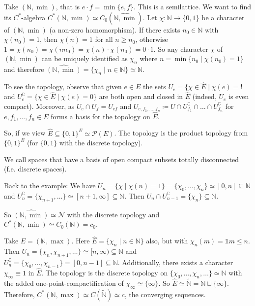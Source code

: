 \documentclass[a4paper]{article}
\begin{document}
\begin{example}
	Take $(\mathds{N}, \min)$, that is $e \cdot f = \min\{e, f\}$.
	This is a semilattice.
	We want to find its $C^*$-algebra $C^*(\mathds{N}, \min) \simeq C_0(\widehat{\mathds{N}, \min})$.
	Let $\chi: \mathds{N} \to \{0,1\}$ 
	be a character of $(\mathds{N}, \min)$ (a non-zero homomorphism).
	If there exists $n_0 \in \mathds{N}$ with $\chi(n_0) = 1$, then $\chi(n) = 1$ for all $n \geq n_0$, otherwise $1 = \chi(n_0) = \chi(n n_0) = \chi(n) \cdot \chi(n_0) = 0 \cdot 1$.
	So any character $\chi$ of $(\mathds{N}, \min)$ can be uniquely identified as $\chi_n$ where $n = \min\{n_0 \mid \chi(n_0) = 1\}$ and therefore $\widehat{(\mathds{N}, \min)} = \{\chi_n \mid n \in \mathds{N} \} \simeq \mathds{N}$. 

	To see the topology, observe that given $e \in E$ the sets $U_e = \{\chi \in \hat{E} \mid \chi(e) = !$ and $U_e^\complement = \{ \chi \in \hat{E} \mid \chi(e) = 0 \}$ are both open and closed in $\hat{E}$ (indeed, $U_e$ is even compact).
	Moreover, as $U_e \cap U_f = U_{ef}$ and $U_{e, f_1, \dots, f_n} \coloneq U \cap U_{f_1 }^\complement \cap \dots \cap U_{f_n}^\complement$ for $e, f_1, \dots, f_n \in E$ forms a basis for the topology on $\hat{E}$. 

	So, if we view $\hat{E} \subseteq \{0,1\}^E \simeq \mathcal{P}(E)$.
	The topology is the product topology from $\{0,1\}^E$ (for $\{0,1\}$ with the discrete topology).

	We call spaces that have a basis of open compact subsets totally disconnected (f.e. discrete spaces).

	Back to the example: We have $U_n = \{ \chi \mid \chi(n) = 1 \} = \{\chi_0, \dots, \chi_n\} \simeq [0,n] \subseteq \mathds{N}$ and $U_n^\complement = \{ \chi_{n+1}, \dots \} \simeq [n+1, \infty] \subseteq \mathds{N}$.
	Then $U_n \cap U_{n-1}^\complement = \{\chi_n\} \subseteq \mathds{N}$.

	So $\widehat{(\mathds{N}, \min)} \simeq \mathscr{N}$ with the discrete topology and $C^*(\mathds{N}, \min) \simeq C_0(\mathds{N}) = c_0$.
\end{example}

\begin{example}
	Take $E = (\mathds{N}, \max)$.
	Here $\hat{E} = \{ \chi_n \mid n \in \mathds{N}\}$ also, but with $\chi_n(m) = \mathds{1}{m \leq n}$.
	Then $U_n = \{\chi_n, \chi_{n+1}, \dots \}\simeq [n, \infty) \subseteq \mathds{N}$ and $U_n^\complement = \{\chi_0, \dots, \chi_{n-1}\} = [0, n-1] \subseteq \mathds{N}$.
	Additionally, there exists a character $\chi_\infty \equiv 1$ in $\hat{E}$.
	The topology is the discrete topology on $\{ \chi_0, \dots, \chi_n, \dots \} \simeq \mathds{N}$ with the added one-point-compactification of $\chi_\infty \simeq \{\infty\}$.
	So $\hat{E} \simeq \tilde{\mathds{N}} = \mathds{N} \sqcup \{ \infty \}$.
	Therefore, $C^*(\mathds{N}, \max) \simeq C(\tilde{\mathds{N}}) \simeq c$, the converging sequences.
\end{example}
\end{document}
